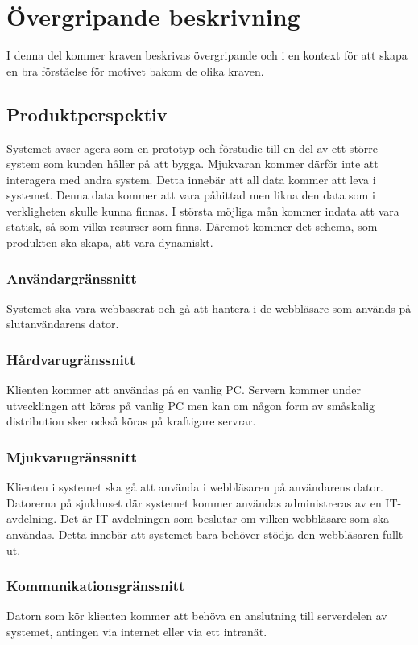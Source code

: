 \documentclass{article}
\begin{document}
\section{Övergripande beskrivning}
\label{sec:overall}
I denna del kommer kraven beskrivas övergripande och i en kontext för att
skapa en bra förståelse för motivet bakom de olika kraven.

\subsection{Produktperspektiv}
\label{subsec:Produktperspektiv}
Systemet avser agera som en prototyp och förstudie till en del av ett större
system som kunden håller på att bygga.
Mjukvaran kommer därför inte att interagera med andra system. Detta innebär att all
data kommer att leva i systemet. Denna data kommer att vara påhittad men likna
den data som i verkligheten skulle kunna finnas.
I största möjliga mån kommer indata att vara statisk, så som vilka resurser som
finns. Däremot kommer det schema, som produkten ska skapa, att vara dynamiskt.
\subsubsection{Användargränssnitt}
\label{subsec:Anvandargranssnitt}
Systemet ska vara webbaserat och gå att hantera i de webbläsare som
används på slutanvändarens dator.
\subsubsection{Hårdvarugränssnitt}
\label{subsec:Hardvarugranssnitt}
Klienten kommer att användas på en vanlig PC. Servern kommer under utvecklingen
att köras på vanlig PC men kan om någon form av småskalig distribution sker
också köras på kraftigare servrar.
\subsubsection{Mjukvarugränssnitt}
\label{subsec:Mjukvarugranssnitt}
Klienten i systemet ska gå att använda i webbläsaren på användarens dator.
Datorerna på sjukhuset där systemet kommer användas administreras av en
IT-avdelning. Det är IT-avdelningen som beslutar om vilken webbläsare som ska
användas. Detta innebär att systemet bara behöver stödja den webbläsaren fullt
ut.
\subsubsection{Kommunikationsgränssnitt}
\label{subsec:Kommunikationsgranssnitt}
Datorn som kör klienten kommer att behöva en
anslutning till serverdelen av systemet, antingen via internet eller via ett
intranät.
\end{document}
